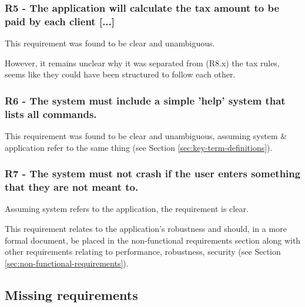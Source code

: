\subsubsection{R5 - The application will calculate the tax amount to be paid by each client [...]} 
This requirement was found to be clear and unambiguous. 
\par
However, it remains unclear why it was separated from (R8.x) the tax rules, seems like they could have been structured to follow each other. 

\subsubsection{R6 - The system must include a simple 'help' system that lists all commands.}

This requirement was found to be clear and unambiguous, assuming system \& application refer to the same thing (see Section \ref{sec:key-term-definitions}). 

\subsubsection{R7 - The system must not crash if the user enters something that they are not meant to.}

Assuming system refers to the application, the requirement is clear. 
\par
This requirement relates to the application's robustness and should, in a more formal document, be placed in the non-functional requirements section along with other requirements relating to performance, robustness, security (see Section \ref{sec:non-functional-requirements}).



\subsection{Missing requirements}

